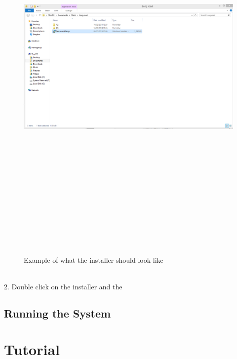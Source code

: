 \begin{figure}[H]
    \includegraphics[height = 20cm]{./Manual/images/install1}
    \caption{Example of what the installer should look like} \label{fig:Flowchart1}
\end{figure}
\\

2. Double click on the installer and the 

\subsection{Running the System}

\section{Tutorial}

